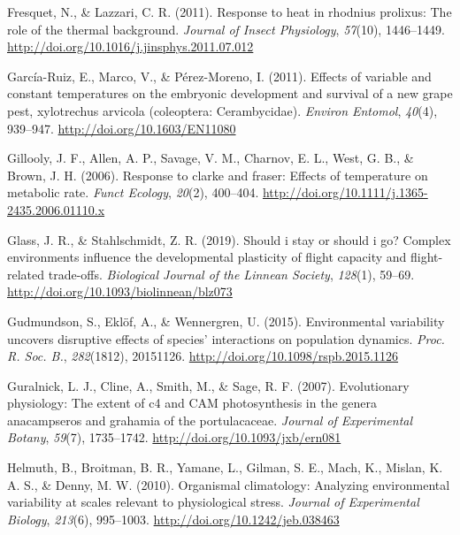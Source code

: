 \documentclass[12pt,twoside]{reedthesis}
\begin{document}
\leavevmode\hypertarget{ref-fresquet_response_2011}{}%
Fresquet, N., \& Lazzari, C. R. (2011). Response to heat in rhodnius prolixus: The role of the thermal background. \emph{Journal of Insect Physiology}, \emph{57}(10), 1446--1449. \url{http://doi.org/10.1016/j.jinsphys.2011.07.012}

\leavevmode\hypertarget{ref-garcia-ruiz_effects_2011}{}%
García-Ruiz, E., Marco, V., \& Pérez-Moreno, I. (2011). Effects of variable and constant temperatures on the embryonic development and survival of a new grape pest, xylotrechus arvicola (coleoptera: Cerambycidae). \emph{Environ Entomol}, \emph{40}(4), 939--947. \url{http://doi.org/10.1603/EN11080}

\leavevmode\hypertarget{ref-gillooly_response_2006}{}%
Gillooly, J. F., Allen, A. P., Savage, V. M., Charnov, E. L., West, G. B., \& Brown, J. H. (2006). Response to clarke and fraser: Effects of temperature on metabolic rate. \emph{Funct Ecology}, \emph{20}(2), 400--404. \url{http://doi.org/10.1111/j.1365-2435.2006.01110.x}

\leavevmode\hypertarget{ref-glass_should_2019}{}%
Glass, J. R., \& Stahlschmidt, Z. R. (2019). Should i stay or should i go? Complex environments influence the developmental plasticity of flight capacity and flight-related trade-offs. \emph{Biological Journal of the Linnean Society}, \emph{128}(1), 59--69. \url{http://doi.org/10.1093/biolinnean/blz073}

\leavevmode\hypertarget{ref-gudmundson_environmental_2015}{}%
Gudmundson, S., Eklöf, A., \& Wennergren, U. (2015). Environmental variability uncovers disruptive effects of species' interactions on population dynamics. \emph{Proc. R. Soc. B.}, \emph{282}(1812), 20151126. \url{http://doi.org/10.1098/rspb.2015.1126}

\leavevmode\hypertarget{ref-guralnick_evolutionary_2007}{}%
Guralnick, L. J., Cline, A., Smith, M., \& Sage, R. F. (2007). Evolutionary physiology: The extent of c4 and CAM photosynthesis in the genera anacampseros and grahamia of the portulacaceae. \emph{Journal of Experimental Botany}, \emph{59}(7), 1735--1742. \url{http://doi.org/10.1093/jxb/ern081}

\leavevmode\hypertarget{ref-helmuth_organismal_2010}{}%
Helmuth, B., Broitman, B. R., Yamane, L., Gilman, S. E., Mach, K., Mislan, K. A. S., \& Denny, M. W. (2010). Organismal climatology: Analyzing environmental variability at scales relevant to physiological stress. \emph{Journal of Experimental Biology}, \emph{213}(6), 995--1003. \url{http://doi.org/10.1242/jeb.038463}
\end{document}
